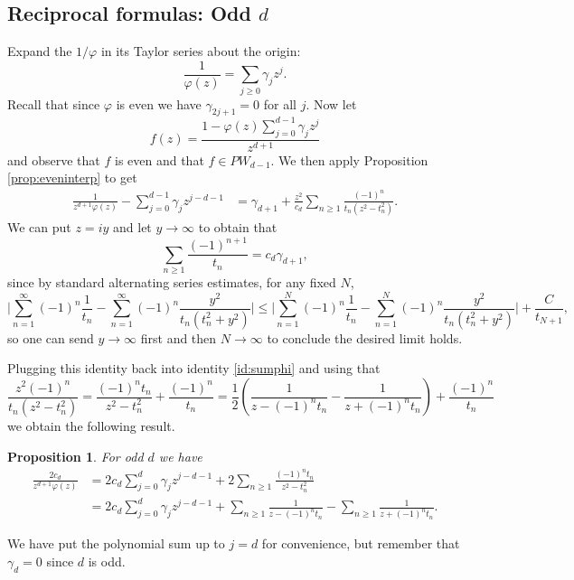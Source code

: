 \documentclass[a4paper,reqno,12pt]{amsart}
\newtheorem{proposition}[theorem]{Proposition}\newtheorem{corollary}[theorem]{Corollary}
\newcommand{\ga}{\gamma}
\newcommand{\p}{\varphi}
\begin{document}
\subsection{Reciprocal formulas: Odd \texorpdfstring{$d$}{d}}
Expand the $1/\p$ in its Taylor series about the origin:
$$
\frac{1}{\p(z)} = \sum_{j\geq 0} \ga_j z^j.
$$
Recall that since $\p$ is even we have $\ga_{2j+1}=0$ for all $j$. 
Now let
$$
f(z)=\frac{1-\p(z)\sum_{j=0}^{d-1} \ga_j z^j}{z^{d+1}}
$$
and observe that $f$ is even and that $f\in PW_{d-1}$. We then apply Proposition \ref{prop:eveninterp} to get
\begin{align}\label{id:sumphi}
\frac{1}{z^{d+1}\p(z)} - \sum_{j=0}^{d-1} \ga_j z^{j-d-1} & = \ga_{d+1} +\frac{z^2}{c_d}\sum_{n\geq 1} \frac{(-1)^{n} }{t_n(z^2-t_n^2)}.
\end{align}
We can put $z=iy$ and let $y\to\infty$ to obtain that
$$
\sum_{n\geq 1} \frac{(-1)^{n+1}}{t_n} = c_d \ga_{d+1},
$$
since by standard alternating series estimates, for any fixed $N$,
$$
    \Bigg|\sum_{n = 1}^\infty(-1)^n \frac{1}{t_n}  - \sum_{n = 1}^\infty (-1)^n \frac{y^2}{t_n(t_n^2 + y^2)}\Bigg| \leq \Bigg|\sum_{n = 1}^N(-1)^n \frac{1}{t_n}  - \sum_{n = 1}^N (-1)^n \frac{y^2}{t_n(t_n^2 + y^2)}\Bigg| + \frac{C}{t_{N+1}}, 
$$
so one can send $y \to \infty$ first and then $N\to \infty$ to conclude the desired limit holds.

Plugging this identity back into identity \eqref{id:sumphi} and using that 
$$
\frac{z^2(-1)^{n} }{t_n(z^2-t_n^2)} = \frac{(-1)^nt_n}{z^2-t_n^2} + \frac{(-1)^{n} }{t_n} =  \frac12\left(\frac{1}{z-(-1)^n t_n} - \frac{1}{z+(-1)^n t_n}\right)+\frac{(-1)^{n} }{t_n}
$$
we obtain the following result.
\begin{proposition}\label{prop:reciprocalformulaodd}
For odd $d$ we have
\begin{align*}
\frac{2c_d}{z^{d+1}\p(z)} & = 2 c_d \sum_{j=0}^{d} \ga_j z^{j-d-1}  + 2\sum_{n\geq 1} \frac{(-1)^nt_n}{z^2-t_n^2}  \\
& = 2 c_d \sum_{j=0}^{d} \ga_j z^{j-d-1} + \sum_{n\geq 1} \frac{1}{z-(-1)^n t_n} -  \sum_{n\geq 1} \frac{1}{z+(-1)^n t_n}.
\end{align*}
\end{proposition}
We have put the polynomial sum up to $j=d$ for convenience, but remember that $\ga_{d}=0$ since $d$ is odd.
\end{document}
